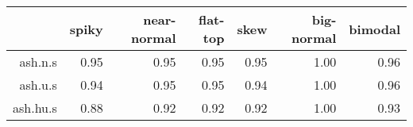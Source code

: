 \begin{tabular}{rrrrrrr}
  \toprule  & spiky & near-normal & flat-top & skew & big-normal & bimodal \\ 
  \midrule ash.n.s & 0.95 & 0.95 & 0.95 & 0.95 & 1.00 & 0.96 \\ 
  ash.u.s & 0.94 & 0.95 & 0.95 & 0.94 & 1.00 & 0.96 \\ 
  ash.hu.s & 0.88 & 0.92 & 0.92 & 0.92 & 1.00 & 0.93 \\ 
   \bottomrule \end{tabular}


